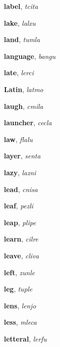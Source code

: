 \documentclass[12pt]{book}
\begin{document}
\begin{description}

\item[ ] \textbf{label}, \textit{tcita}

\item[ ] \textbf{lake}, \textit{lalxu}

\item[ ] \textbf{land}, \textit{tumla}

\item[ ] \textbf{language}, \textit{bangu}

\item[ ] \textbf{late}, \textit{lerci}

\item[ ] \textbf{Latin}, \textit{latmo}

\item[ ] \textbf{laugh}, \textit{cmila}

\item[ ] \textbf{launcher}, \textit{cecla}

\item[ ] \textbf{law}, \textit{flalu}

\item[ ] \textbf{layer}, \textit{senta}

\item[ ] \textbf{lazy}, \textit{lazni}

\item[ ] \textbf{lead}, \textit{cnisa}

\item[ ] \textbf{leaf}, \textit{pezli}

\item[ ] \textbf{leap}, \textit{plipe}

\item[ ] \textbf{learn}, \textit{cilre}

\item[ ] \textbf{leave}, \textit{cliva}

\item[ ] \textbf{left}, \textit{zunle}

\item[ ] \textbf{leg}, \textit{tuple}

\item[ ] \textbf{lens}, \textit{lenjo}

\item[ ] \textbf{less}, \textit{mleca}

\item[ ] \textbf{letteral}, \textit{lerfu}


\end{description}
\end{document}
